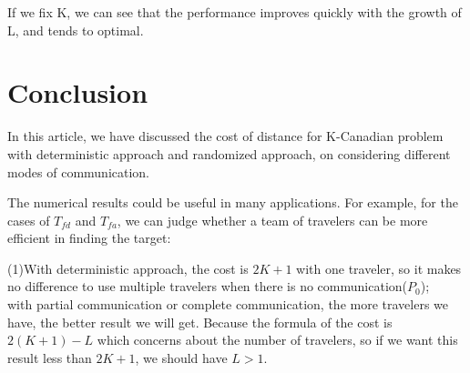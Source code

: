\documentclass[letter-size, 11pt]{article}
\begin{document}
If we fix K, we can see that the performance improves quickly with the growth of L, and tends to optimal.

%


\section{Conclusion}
In this article, we have discussed the cost of distance for K-Canadian problem with deterministic approach and randomized approach, on considering different modes of communication. 

The numerical results could be useful in many applications. For example, for the cases of $T_{fd}$ and $T_{fa}$, we can judge whether a team of travelers can be more efficient in finding the target:

(1)With deterministic approach, the cost is $2K+1$ with one traveler, so it makes no difference to use multiple travelers when there is no communication($P_0$); 
\\with partial communication or complete communication, the more travelers we have, the better result we will get. Because the formula of the cost is $2(K+1)-L$ which concerns about the number of travelers, so if we want this result less than $2K+1$, we should have $L>1$.
\end{document}
